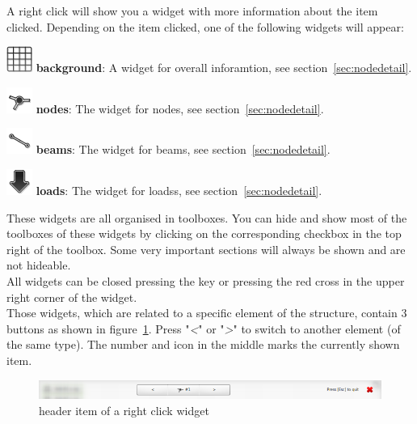 \documentclass[a4paper,11pt]{report}
\begin{document}
A right click will show you a widget with more information about the item clicked. Depending on the item clicked, one of the following widgets will appear:
\begin{trivlist}
	\leftskip=1cm
	\item[] \includegraphics[scale = 0.5]{../../icons/grid.png} \textbf{background}: A widget for overall inforamtion, see section~\ref{sec:nodedetail}.
	\item[] \includegraphics[scale = 0.5]{../../icons/node.png} \textbf{nodes}: The widget for nodes, see section~\ref{sec:nodedetail}.
	\item[] \includegraphics[scale = 0.5]{../../icons/beam.png} \textbf{beams}: The widget for beams, see section~\ref{sec:nodedetail}.
	\item[] \includegraphics[scale = 0.5]{../../icons/load.png} \textbf{loads}: The widget for loadss, see section~\ref{sec:nodedetail}.
	
\end{trivlist}



These widgets are all organised in toolboxes. You can hide and show most of the toolboxes of these widgets by clicking on the corresponding checkbox in the top right of the toolbox. Some very important sections will always be shown and are not hideable.\\
All widgets can be closed pressing the  key or pressing the red cross in the upper right corner of the widget. \\
Those widgets, which are related to a specific element of the structure, contain 3 buttons as shown in figure~\ref{pic:overlayheader}. Press "\textit{<}" or "\textit{>}" to switch to another element (of the same type). The number and icon in the middle marks the currently shown item.

\begin{figure}[H]
\begin{center}
\includegraphics[width=\textwidth]{../pictures/overlayheader.png}
\caption{header item of a right click widget}
\label{pic:overlayheader}
\end{center}
\end{figure}
\end{document}
